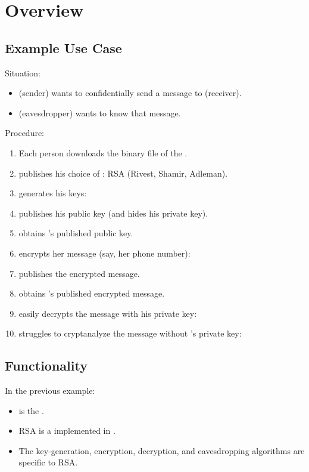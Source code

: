 \section{Overview}


\subsection{Example Use Case}

Situation:
\begin{itemize}
\item
  \alice{} (sender) wants to confidentially send a message
  to \bob{} (receiver).
\item
  \eve{} (eavesdropper) wants to know that message.
\end{itemize}

Procedure:
\begin{enumerate}
\item
  Each person downloads the binary file 
  of the \cry{} \cf.
\item
  \bob{} publishes his choice of \cs:
  RSA (Rivest, Shamir, Adleman).
\item
  \bob{} generates his keys: \generatekeysex
\item
  \bob{} publishes his public key
  (and hides his private key).
\item
  \alice{} obtains \bob's published public key.
\item
  \alice{} encrypts her message (say, her phone number):
  \encryptex
\item
  \alice{} publishes the encrypted message.
\item
  \bob{} obtains \alice's published encrypted message.
\item
  \bob{} easily decrypts the message with his private key:
  \decryptex
\item
  \eve{} struggles to cryptanalyze the message
  without \bob's private key: \cryptanalyzeex
\end{enumerate}


\subsection{Functionality}

In the previous example:
\begin{itemize}
\item
  \cry{} is the \cf.
\item
  RSA is a \cs{} implemented in \cry.
\item
  The key-generation, encryption, decryption,
  and eavesdropping algorithms are specific to RSA.
\end{itemize}

